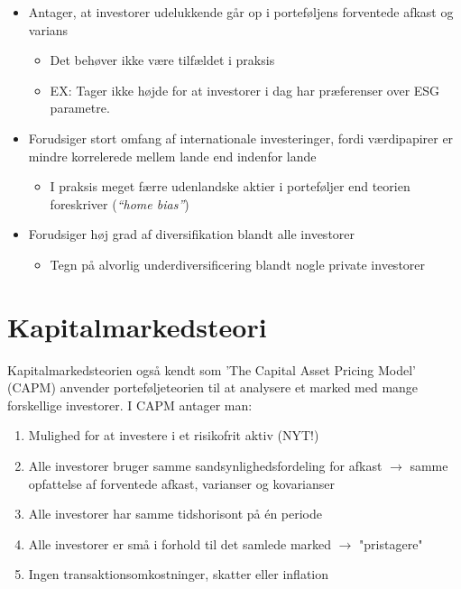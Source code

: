 \documentclass[10pt,reqno, usenames]{article}
\begin{document}
\begin{itemize}
    \item Antager, at investorer udelukkende går op i porteføljens forventede afkast og varians
    \begin{itemize}
        \item Det behøver ikke være tilfældet i praksis
        \item EX: Tager ikke højde for at investorer i dag har præferenser over ESG parametre.
    \end{itemize}
    \item Forudsiger stort omfang af internationale investeringer, fordi værdipapirer er mindre korrelerede mellem lande end indenfor lande
    \begin{itemize}
        \item I praksis meget færre udenlandske aktier i porteføljer end teorien foreskriver (\textit{“home bias”})
    \end{itemize}
    \item Forudsiger høj grad af diversifikation blandt alle investorer
    \begin{itemize}
        \item Tegn på alvorlig underdiversificering blandt nogle private investorer
    \end{itemize}
\end{itemize}

\section{Kapitalmarkedsteori}
Kapitalmarkedsteorien også kendt som 'The Capital Asset Pricing Model' (CAPM) anvender porteføljeteorien til at analysere et marked med mange
forskellige investorer. I CAPM antager man: 

\begin{enumerate}
    \item Mulighed for at investere i et risikofrit aktiv (NYT!)
    \item Alle investorer bruger samme sandsynlighedsfordeling for afkast $\rightarrow$ samme opfattelse af forventede afkast, varianser og kovarianser
    \item Alle investorer har samme tidshorisont på én periode
    \item Alle investorer er små i forhold til det samlede marked $\rightarrow$ "pristagere"
    \item Ingen transaktionsomkostninger, skatter eller inflation
\end{enumerate}
\end{document}
